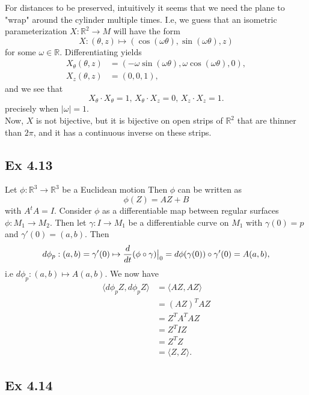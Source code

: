\documentclass{article}
\newcommand\restr[2]{{%
  \left.\kern-\nulldelimiterspace %
  #1 %
  \vphantom{\big|} %
  \right|_{#2} %
  }}
\theoremstyle{definition}
\newcommand{\R}{\mathbb{R}}
\begin{document}
For distances to be preserved, intuitively it seems that we need the plane to
"wrap" around the cylinder multiple times. I.e, we guess that an isometric
parameterization $X : \R^2 \to M$ will have the form
\[
	X : (\theta, z) \mapsto (\cos(\omega \theta), \sin(\omega \theta), z)
\] 
for some $\omega \in \R$. Differentiating yields 
\begin{align*}
	X_{\theta}(\theta, z)
	&=
	( -\omega \sin(\omega \theta), \omega \cos(\omega \theta), 0), \\
	X_z(\theta, z)
	&=
	(0,0,1),
\end{align*}
and we see that
\[
	X_{\theta} \cdot X_{\theta} = 1, \,
	X_{\theta} \cdot X_{z} = 0, \,
	X_z \cdot X_z = 1.
\]
precisely when $|\omega| = 1$. \\

Now, $X$ is not bijective, but it is bijective on open strips of $\R^2$ that
are thinner than $2\pi$, and it has a continuous inverse on these strips.

\subsection*{Ex 4.13}

Let $\phi : \R^3 \to \R^3$ be a Euclidean motion
Then $\phi$ can be written as 
\[
	\phi(Z) = AZ + B
\] 
with $A^t A = I$. Consider $\phi$ as a differentiable map between regular
surfaces $\phi : M_1 \to M_2$. Then let $\gamma : I \to M_1$ be a
differentiable curve on $M_1$ with $\gamma(0) = p$ and $\gamma'(0) = (a, b)$.
Then 
\[
	d\phi_p
	:
	(a, b)
	=
	\gamma'(0)
	\mapsto
	\frac{d}{dt}
	\restr{(\phi \circ \gamma)}{0}
	=
	d\phi(\gamma(0)) \circ \gamma'(0)
	=
	A (a, b),
\] 
i.e $d\phi_p : (a, b) \mapsto A (a, b)$. We now have 
\begin{align*}
	\langle d\phi_p Z, d\phi_p Z \rangle 
	&=
	\langle AZ, AZ \rangle \\
	&=
	(AZ)^T AZ \\
	&=
	Z^T A^T A Z \\ 
	&=
	Z^T I Z \\
	&=
	Z^T Z \\
	&=
	\langle Z, Z \rangle.
\end{align*}

\subsection*{Ex 4.14}
\end{document}
